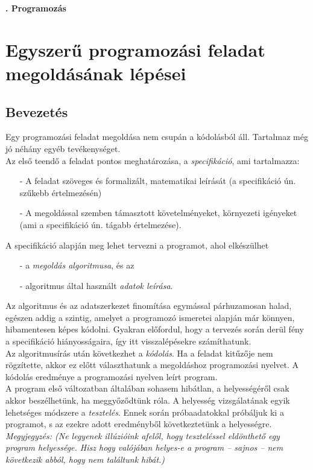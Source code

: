 \documentclass[12pt,margin=0px]{article}
\begin{document}
    \thispagestyle{fancy}

    {\Large\bfseries{}. Programozás} \\
	
	\section*{Egyszerű programozási feladat megoldásának lépései}
	\subsection*{Bevezetés}
	Egy programozási feladat megoldása nem csupán a kódolásból áll. Tartalmaz még jó néhány egyéb tevékenységet.\\

    \noindent Az első teendő a feladat pontos meghatározása, a \emph{specifikáció}, ami tartalmazza:
    \begin{itemize}
       \item[-] A feladat szöveges és formalizált, matematikai leírását (a specifikáció ún. szűkebb értelmezésén)
       \item[-] A megoldással szemben támasztott követelményeket, környezeti igényeket (ami a specifikáció ún. tágabb értelmezése).
    \end{itemize}
	
    \noindent A specifikáció alapján meg lehet tervezni a programot, ahol elkészülhet
     \begin{itemize}
        \item[-] a \emph{megoldás algoritmusa}, és az
        \item[-] algoritmus által használt \emph{adatok leírása}.
     \end{itemize}

     \noindent Az algoritmus és az adatszerkezet finomítása egymással párhuzamosan halad, egészen addig a szintig, amelyet a programozó ismeretei alapján már könnyen, hibamentesen képes kódolni. Gyakran előfordul, hogy a tervezés során derül fény a specifikáció hiányosságaira, így itt visszalépésekre számíthatunk.\\
	
    \noindent Az algoritmusírás után következhet a \emph{kódolás}. Ha a feladat kitűzője nem rögzítette, akkor ez előtt választhatunk a megoldáshoz programozási nyelvet. A kódolás eredménye a programozási nyelven leírt program.\\
	
    \noindent A program első változatban általában sohasem hibátlan, a helyességéről csak akkor beszélhetünk, ha meggyőződtünk róla. A helyesség vizsgálatának egyik lehetséges módszere a \emph{tesztelés}. Ennek során próbaadatokkal próbáljuk ki a programot, s az ezekre adott eredményből következtetünk a helyességre.\\
    \emph{Megyjegyzés: (Ne legyenek illúzióink afelől, hogy teszteléssel eldönthető egy program helyessége. Hisz hogy valójában helyes-e a program – sajnos – nem következik abból, hogy nem találtunk hibát.)}\\
	
\end{document}
